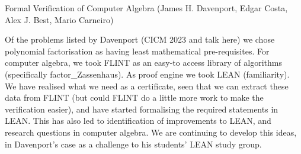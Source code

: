 Formal Verification of Computer Algebra
(James H. Davenport, Edgar Costa, Alex J. Best, Mario Carneiro)

Of the problems listed by Davenport (CICM 2023 and talk here) we chose polynomial factorisation as having least mathematical pre-requisites.
For computer algebra, we took FLINT as an easy-to access library of algorithms (specifically factor_Zassenhaus).
As proof engine we took LEAN (familiarity).
We have realised what we need as a certificate, seen that we can extract these data from FLINT (but could FLINT do a little more work to make the
verification easier), and have started formalising the required statements in LEAN.
This has also led to identification of improvements to LEAN, and research questions in computer algebra.
We are continuing to develop this ideas, in Davenport's case as a challenge to his students' LEAN study group.

